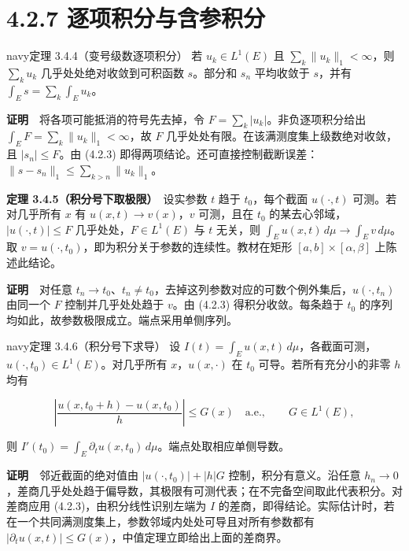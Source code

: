 \documentclass[11pt,a4paper]{article}
\begin{document}
\clearpage\section[\S{}4.2.7
逐项积分与含参积分]{4.2.7
逐项积分与含参积分}\label{ux9010ux9879ux79efux5206ux4e0eux542bux53c2ux79efux5206}

\begin{sboxenv}{navy}{定理 3.4.4（变号级数逐项积分）}
若 \(u_k\in L^1(E)\) 且 \(\sum_k\|u_k\|_1<\infty\)，则 \(\sum_k u_k\)
几乎处处绝对收敛到可积函数 \(s\)。部分和 \(s_n\) 平均收敛于 \(s\)，并有
\(\int_E s=\sum_k\int_Eu_k\)。

\end{sboxenv}

\textbf{证明}　将各项可能抵消的符号先去掉，令
\(F=\sum_k|u_k|\)。非负逐项积分给出
\(\int_E F=\sum_k\|u_k\|_1<\infty\)，故 \(F\)
几乎处处有限。在该满测度集上级数绝对收敛，且 \(|s_n|\le F\)。由 (4.2.3)
即得两项结论。还可直接控制截断误差：\(\|s-s_n\|_1\le\sum_{k>n}\|u_k\|_1\)。

\textbf{定理 3.4.5（积分号下取极限）}　设实参数 \(t\) 趋于
\(t_0\)，每个截面 \(u(\cdot,t)\) 可测。若对几乎所有 \(x\) 有
\(u(x,t)\to v(x)\)，\(v\) 可测，且在 \(t_0\)
的某去心邻域，\(|u(\cdot,t)|\le F\) 几乎处处，\(F\in L^1(E)\) 与 \(t\)
无关，则 \(\int_Eu(x,t)\,d\mu\to\int_Ev\,d\mu\)。取
\(v=u(\cdot,t_0)\)，即为积分关于参数的连续性。教材在矩形
\([a,b]\times[\alpha,\beta]\) 上陈述此结论。

\textbf{证明}　对任意
\(t_n\to t_0\)、\(t_n\ne t_0\)，去掉这列参数对应的可数个例外集后，\(u(\cdot,t_n)\)
由同一个 \(F\) 控制并几乎处处趋于 \(v\)。由 (4.2.3) 得积分收敛。每条趋于
\(t_0\) 的序列均如此，故参数极限成立。端点采用单侧序列。

\begin{sboxenv}{navy}{定理 3.4.6（积分号下求导）}
设
\(I(t)=\int_Eu(x,t)\,d\mu\)，各截面可测，\(u(\cdot,t_0)\in L^1(E)\)。对几乎所有
\(x\)，\(u(x,\cdot)\) 在 \(t_0\) 可导。若所有充分小的非零 \(h\) 均有

\begin{equation*}
\left|\frac{u(x,t_0+h)-u(x,t_0)}{h}\right|\le G(x)\quad\text{a.e.},\qquad G\in L^1(E),
\end{equation*}

则 \(I'(t_0)=\int_E\partial_t u(x,t_0)\,d\mu\)。端点处取相应单侧导数。

\end{sboxenv}

\textbf{证明}　邻近截面的绝对值由 \(|u(\cdot,t_0)|+|h|G\)
控制，积分有意义。沿任意
\(h_n\to0\)，差商几乎处处趋于偏导数，其极限有可测代表；在不完备空间取此代表积分。对差商应用
(4.2.3)，由积分线性识别左端为 \(I\)
的差商，即得结论。实际估计时，若在一个共同满测度集上，参数邻域内处处可导且对所有参数都有
\(|\partial_tu(x,t)|\le G(x)\)，中值定理立即给出上面的差商界。
\end{document}
